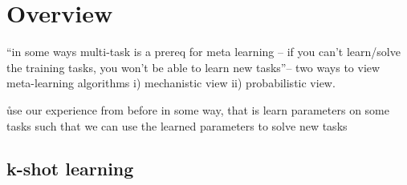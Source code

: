 \section{Overview}



\r{``in some ways multi-task is a prereq for meta learning -- if you can't learn/solve the training tasks, you won't be able to learn new tasks''-- two ways to view meta-learning algorithms i) mechanistic view ii) probabilistic view.}

\r{use our experience from before in some way, that is learn parameters on some tasks such that we can use the learned parameters to solve new tasks}



\subsection{k-shot learning}


